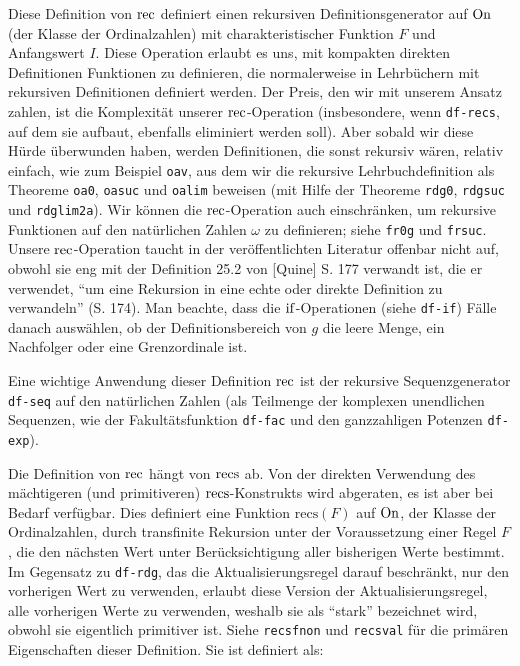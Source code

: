 Diese Definition von ${\rm rec}$ definiert einen rekursiven Definitionsgenerator auf ${\rm On}$ (der Klasse der Ordinalzahlen) mit charakteristischer Funktion $F$ und Anfangswert $I$. Diese Operation erlaubt es uns, mit kompakten direkten Definitionen Funktionen zu definieren, die normalerweise in Lehrbüchern mit rekursiven Definitionen definiert werden. Der Preis, den wir mit unserem Ansatz zahlen, ist die Komplexität unserer ${\rm rec}$-Operation (insbesondere, wenn {\tt df-recs}, auf dem sie aufbaut, ebenfalls eliminiert werden soll). Aber sobald wir diese Hürde überwunden haben, werden Definitionen, die sonst rekursiv wären, relativ einfach, wie zum Beispiel {\tt oav}, aus dem wir die rekursive Lehrbuchdefinition als Theoreme {\tt oa0}, {\tt oasuc} und {\tt oalim} beweisen (mit Hilfe der Theoreme {\tt rdg0}, {\tt rdgsuc} und {\tt rdglim2a}).  Wir können die ${\rm rec}$-Operation auch einschränken, um rekursive Funktionen auf den natürlichen Zahlen $\omega$ zu definieren; siehe {\tt fr0g} und {\tt frsuc}.  Unsere ${\rm rec}$-Operation taucht in der veröffentlichten Literatur offenbar nicht auf, obwohl sie eng mit der Definition 25.2 von [Quine] S. 177 verwandt ist, die er verwendet, "`um eine Rekursion in eine echte oder direkte Definition zu verwandeln"' (S. 174).  Man beachte, dass die ${\rm if}$-Operationen (siehe {\tt df-if}) Fälle danach auswählen, ob der Definitionsbereich von $g$ die leere Menge, ein Nachfolger oder eine Grenzordinale ist. 

Eine wichtige Anwendung dieser Definition ${\rm rec}$ ist der rekursive Sequenzgenerator {\tt df-seq} auf den natürlichen Zahlen (als Teilmenge der komplexen unendlichen Sequenzen, wie der Fakultätsfunktion {\tt df-fac} und den ganzzahligen Potenzen {\tt df-exp}). 

Die Definition von ${\rm rec}$ hängt von ${\rm recs}$ ab. Von der direkten Verwendung des mächtigeren (und primitiveren) ${\rm recs}$-Konstrukts wird abgeraten, es ist aber bei Bedarf verfügbar. Dies definiert eine Funktion $\mathrm{recs} ( F )$ auf ${\rm On}$, der Klasse der Ordinalzahlen, durch transfinite Rekursion unter der Voraussetzung einer Regel $F$, die den nächsten Wert unter Berücksichtigung aller bisherigen Werte bestimmt. Im Gegensatz zu {\tt df-rdg}, das die Aktualisierungsregel darauf beschränkt, nur den vorherigen Wert zu verwenden, erlaubt diese Version der Aktualisierungsregel, alle vorherigen Werte zu verwenden, weshalb sie als "`stark"' bezeichnet wird, obwohl sie eigentlich primitiver ist.  Siehe {\tt recsfnon} und {\tt recsval} für die primären Eigenschaften dieser Definition. Sie ist definiert als: 

